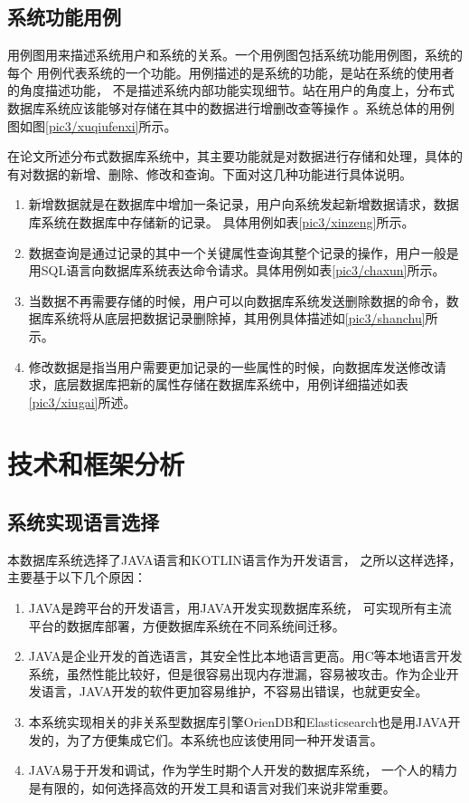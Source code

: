 \subsection{系统功能用例}
用例图用来描述系统用户和系统的关系。一个用例图包括系统功能用例图，系统的每个
用例代表系统的一个功能。用例描述的是系统的功能，是站在系统的使用者的角度描述功能，
不是描述系统内部功能实现细节。站在用户的角度上，分布式数据库系统应该能够对存储在其中的数据进行增删改查等操作
。系统总体的用例图如图\ref{pic3/xuqiufenxi}所示。

在论文所述分布式数据库系统中，其主要功能就是对数据进行存储和处理，具体的有对数据的新增、删除、修改和查询。下面对这几种功能进行具体说明。
\begin{enumerate}[fullwidth,itemindent=2em,listparindent=2em]
	\item 新增数据就是在数据库中增加一条记录，用户向系统发起新增数据请求，数据库系统在数据库中存储新的记录。
	具体用例如表\ref{pic3/xinzeng}所示。
	\item 数据查询是通过记录的其中一个关键属性查询其整个记录的操作，用户一般是用SQL语言向数据库系统表达命令请求。具体用例如表\ref{pic3/chaxun}所示。
\item 当数据不再需要存储的时候，用户可以向数据库系统发送删除数据的命令，数据库系统将从底层把数据记录删除掉，其用例具体描述如\ref{pic3/shanchu}所示。
\item 	修改数据是指当用户需要更加记录的一些属性的时候，向数据库发送修改请求，底层数据库把新的属性存储在数据库系统中，用例详细描述如表\ref{pic3/xiugai}所述。
\end{enumerate}
\section{技术和框架分析}
\subsection{系统实现语言选择}
本数据库系统选择了JAVA语言和KOTLIN语言作为开发语言，
之所以这样选择，主要基于以下几个原因：
\begin{enumerate}[fullwidth,itemindent=2em,listparindent=2em]
	\item JAVA是跨平台的开发语言，用JAVA开发实现数据库系统，
	可实现所有主流平台的数据库部署，方便数据库系统在不同系统间迁移。
	\item JAVA是企业开发的首选语言，其安全性比本地语言更高。用C等本地语言开发系统，虽然性能比较好，但是很容易出现内存泄漏，容易被攻击。作为企业开发语言，JAVA开发的软件更加容易维护，不容易出错误，也就更安全。
	\item 本系统实现相关的非关系型数据库引擎OrienDB和Elasticsearch也是用JAVA开发的，为了方便集成它们。本系统也应该使用同一种开发语言。
	\item JAVA易于开发和调试，作为学生时期个人开发的数据库系统，
	一个人的精力是有限的，如何选择高效的开发工具和语言对我们来说非常重要。
\end{enumerate}
